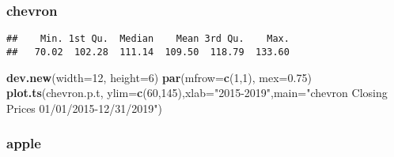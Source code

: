 \documentclass[]{article}
\newenvironment{Shaded}{\begin{snugshade}}{\end{snugshade}}
\newcommand{\KeywordTok}[1]{\textcolor[rgb]{0.13,0.29,0.53}{\textbf{#1}}}
\newcommand{\DataTypeTok}[1]{\textcolor[rgb]{0.13,0.29,0.53}{#1}}
\newcommand{\DecValTok}[1]{\textcolor[rgb]{0.00,0.00,0.81}{#1}}
\newcommand{\FloatTok}[1]{\textcolor[rgb]{0.00,0.00,0.81}{#1}}
\newcommand{\StringTok}[1]{\textcolor[rgb]{0.31,0.60,0.02}{#1}}
\newcommand{\OperatorTok}[1]{\textcolor[rgb]{0.81,0.36,0.00}{\textbf{#1}}}
\newcommand{\NormalTok}[1]{#1}
\begin{document}
\subsubsection{chevron}\label{chevron}

\begin{Shaded}
\end{Shaded}

\begin{verbatim}
##    Min. 1st Qu.  Median    Mean 3rd Qu.    Max. 
##   70.02  102.28  111.14  109.50  118.79  133.60
\end{verbatim}

\begin{Shaded}
\begin{Highlighting}[]
\KeywordTok{dev.new}\NormalTok{(}\DataTypeTok{width=}\DecValTok{12}\NormalTok{, }\DataTypeTok{height=}\DecValTok{6}\NormalTok{)}
\KeywordTok{par}\NormalTok{(}\DataTypeTok{mfrow=}\KeywordTok{c}\NormalTok{(}\DecValTok{1}\NormalTok{,}\DecValTok{1}\NormalTok{), }\DataTypeTok{mex=}\FloatTok{0.75}\NormalTok{)}
\KeywordTok{plot.ts}\NormalTok{(chevron.p.t, }\DataTypeTok{ylim=}\KeywordTok{c}\NormalTok{(}\DecValTok{60}\NormalTok{,}\DecValTok{145}\NormalTok{),}\DataTypeTok{xlab=}\StringTok{"2015-2019"}\NormalTok{,}\DataTypeTok{main=}\StringTok{"chevron Closing Prices 01/01/2015-12/31/2019"}\NormalTok{)}
\end{Highlighting}
\end{Shaded}

\subsubsection{apple}\label{apple}

\begin{Shaded}
\end{Shaded}
\end{document}
